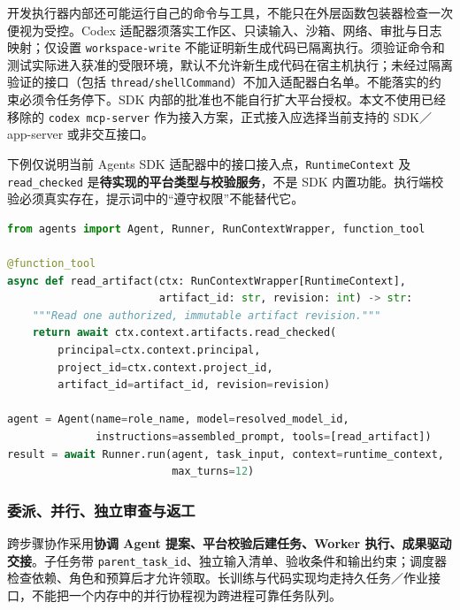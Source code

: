\documentclass[11pt,a4paper]{article}
\begin{document}
开发执行器内部还可能运行自己的命令与工具，不能只在外层函数包装器检查一次便视为受控。Codex 适配器须落实工作区、只读输入、沙箱、网络、审批与日志映射；仅设置 \texttt{workspace-write} 不能证明新生成代码已隔离执行。须验证命令和测试实际进入获准的受限环境，默认不允许新生成代码在宿主机执行；未经过隔离验证的接口（包括 \texttt{thread/shellCommand}）不加入适配器白名单。不能落实的约束必须令任务停下。SDK 内部的批准也不能自行扩大平台授权。本文不使用已经移除的 \texttt{codex mcp-server} 作为接入方案，正式接入应选择当前支持的 SDK／app-server 或非交互接口。\cite{codex-sdk,codex-app}

下例仅说明当前 Agents SDK 适配器中的接口接入点，\texttt{RuntimeContext} 及 \texttt{read\_checked} 是\textbf{待实现的平台类型与校验服务}，不是 SDK 内置功能。执行端校验必须真实存在，提示词中的“遵守权限”不能替代它。\cite{rdRuntimeAgent}

\par\noindent\begin{minipage}{\linewidth}
\begin{lstlisting}[language=Python,caption={SDK 接线片段；省略平台服务实现，不表示已运行测试}]
from agents import Agent, Runner, RunContextWrapper, function_tool

@function_tool
async def read_artifact(ctx: RunContextWrapper[RuntimeContext],
                        artifact_id: str, revision: int) -> str:
    """Read one authorized, immutable artifact revision."""
    return await ctx.context.artifacts.read_checked(
        principal=ctx.context.principal,
        project_id=ctx.context.project_id,
        artifact_id=artifact_id, revision=revision)

agent = Agent(name=role_name, model=resolved_model_id,
              instructions=assembled_prompt, tools=[read_artifact])
result = await Runner.run(agent, task_input, context=runtime_context,
                          max_turns=12)
\end{lstlisting}
\end{minipage}\par


\subsubsection{委派、并行、独立审查与返工}

跨步骤协作采用\textbf{协调 Agent 提案、平台校验后建任务、Worker 执行、成果驱动交接}。子任务带 \texttt{parent\_task\_id}、独立输入清单、验收条件和输出约束；调度器检查依赖、角色和预算后才允许领取。长训练与代码实现均走持久任务／作业接口，不能把一个内存中的并行协程视为跨进程可靠任务队列。
\end{document}

